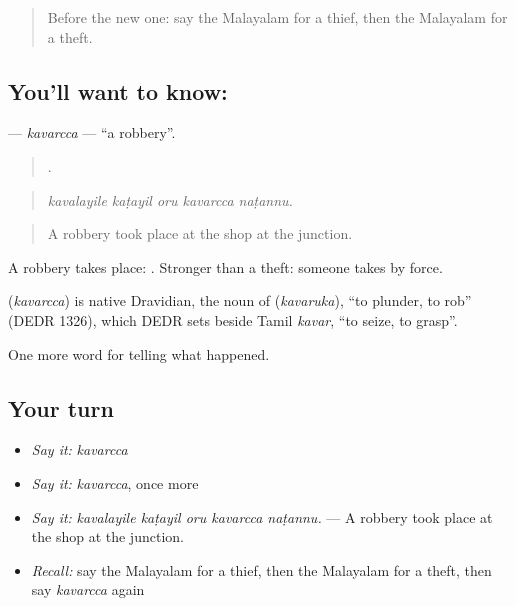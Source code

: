 \label{lesson:ML-C364-kavarcca}



\begin{quote}
Before the new one: say the Malayalam for a thief, then the Malayalam for a theft.
\end{quote}

\subsection*{You'll want to know: }
\textbf{} — \emph{kavarcca} — \textquotedblleft{}a robbery\textquotedblright{}.

\begin{quote}
    .
\end{quote}

\begin{quote}
\emph{kavalayile kaṭayil oru kavarcca naṭannu.}
\end{quote}

\begin{quote}
A robbery took place at the shop at the junction.
\end{quote}

A robbery takes place:  . Stronger than a theft: someone takes by force.

\begin{cousinweb}
\textbf{} (\emph{kavarcca}) is native Dravidian, the noun of  (\emph{kavaruka}), \textquotedblleft{}to plunder, to rob\textquotedblright{} (DEDR 1326), which DEDR sets beside Tamil \emph{kavar}, \textquotedblleft{}to seize, to grasp\textquotedblright{}.
\end{cousinweb}

\begin{grammarlens}[title={What you've built}]
One more word for telling what happened.
\end{grammarlens}

\subsection*{Your turn}
\begin{itemize}
\raggedright
  \item \emph{Say it:} \emph{kavarcca}
  \item \emph{Say it:} \emph{kavarcca}, once more
  \item \emph{Say it:} \emph{kavalayile kaṭayil oru kavarcca naṭannu.} — A robbery took place at the shop at the junction.
  \item \emph{Recall:} say the Malayalam for a thief, then the Malayalam for a theft, then say \emph{kavarcca} again
\end{itemize}

